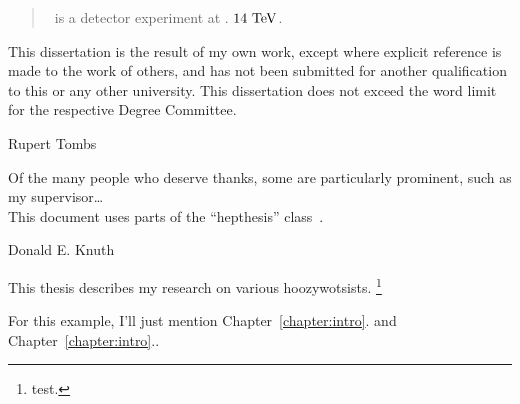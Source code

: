 

\begin{abstract}
\atlas\ is a detector experiment at \cern. $14~\eV[T]$.
\end{abstract}


\begin{declaration}
This dissertation is the result of my own work, except where explicit
reference is made to the work of others, and has not been submitted
for another qualification to this or any other university. This
dissertation does not exceed the word limit for the respective Degree
Committee.
\vspace*{1cm}
\begin{flushright}
Rupert Tombs
\end{flushright}
\end{declaration}


\begin{acknowledgements}
Of the many people who deserve thanks, some are particularly prominent,
such as my supervisor\dots
\\
This document uses parts of the ``hepthesis'' class~\cite{hepthesis}.
\end{acknowledgements}


\begin{preface}
\begin{singlespacing}
\begin{epigraphs}
%
{Donald E. Knuth~\cite{knuth1975art}}
\end{epigraphs}
\end{singlespacing}


This thesis describes my research on various hoozywotsists.%
\footnote{test.}

\noindent
For this example, I'll just mention Chapter~\ref{chapter:intro}.
and Chapter~\ref{chapter:intro}..
\end{preface}


\tableofcontents


\thispagestyle{empty}

